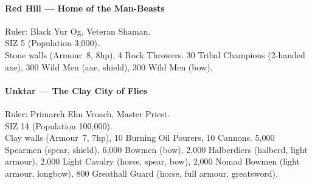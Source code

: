 \documentclass[itdr]{subfiles}
\begin{document}
\paragraph{Red Hill --- Home of the Man-Beasts}
Ruler: Black Yur Og, Veteran Shaman.\\
SIZ 5 (Population 3,000).\\
Stone walls (Armour~8, 8hp), 4 Rock Throwers. 30 Tribal Champions (2-handed axe), 300 Wild Men (axe, shield), 300 Wild Men (bow).

\paragraph{Unktar --- The Clay City of Flies}
Ruler: Primarch Elm Vroach, Master Priest.\\
SIZ 14 (Population 100,000).\\
Clay walls (Armour~7, 7hp), 10 Burning Oil Pourers, 10 Cannons. 5,000 Spearmen (spear, shield), 6,000 Bowmen (bow), 2,000 Halberdiers (halberd, light armour), 2,000 Light Cavalry (horse, spear, bow), 2,000 Nomad Bowmen (light armour, longbow), 800 Greathall Guard (horse, full armour, greatsword).
\end{document}
